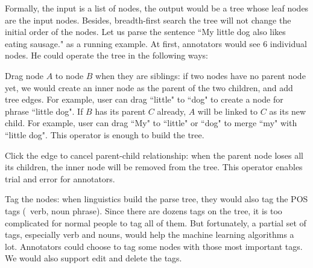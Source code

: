 Formally, the input is a list of nodes, the output would be a tree
whose leaf nodes are the input nodes. Besides, breadth-first search
the tree will not change the initial order of the nodes. Let us parse
the sentence ``My little dog also likes eating sausage." as a running
example. At first, annotators would see 6 individual nodes. He could
operate the tree in the following ways:

Drag node $A$ to node $B$ when they are siblings: if two nodes have no
parent node yet, we would create an inner node as the parent of the
two children, and add tree edges. For example, user can drag ``little"
to ``dog" to create a node for phrase ``little dog". If $B$ has its
parent $C$ already, $A$ will be linked to $C$ as its new child. For
example, user can drag ``My" to ``little" or ``dog" to merge ``my"
with ``little dog". This operator is enough to build the tree.

Click the edge to cancel parent-child relationship: when the parent
node loses all its children, the inner node will be removed from the
tree. This operator enables trial and error for annotators.

Tag the nodes: when linguistics build the parse tree, they would also
tag the POS tags (\ie\ verb, noun phrase). Since there are dozens tags
on the tree, it is too complicated for normal people to tag all of
them. But fortunately, a partial set of tags, especially verb and
nouns, would help the machine learning algorithms a lot. Annotators
could choose to tag some nodes with those most important tags. We
would also support edit and delete the tags.



